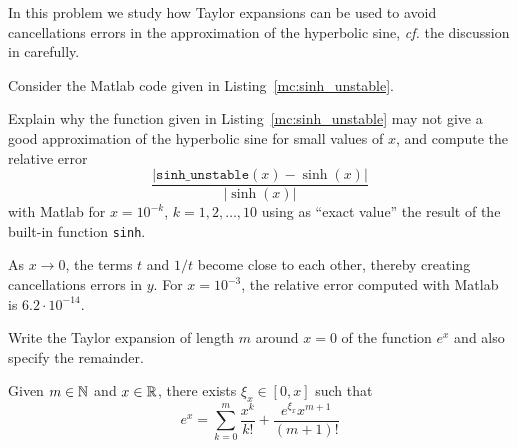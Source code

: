 
\renewcommand{\chpt}{ch_matvec}

\begin{problem} \label{prb:sinh}

In this problem we study how Taylor expansions can be used to avoid cancellations
errors in the approximation of the hyperbolic sine, \emph{cf.} the discussion in 
 carefully.

Consider the Matlab code given in Listing~\ref{mc:sinh_unstable}.


\begin{subproblem}[1]
  Explain why the function given in Listing~\ref{mc:sinh_unstable} may not give a good approximation of the hyperbolic sine for small values of $x$, and compute the relative error
  \[
\frac{|\mathtt{sinh\_unstable}(x)-\sinh(x)|}{|\sinh(x)|}
\]
with Matlab for $x=10^{-k}$, $k=1,2,\ldots,10$ using as ``exact value'' the result
of the \matlab{} built-in function \texttt{sinh}.
  \begin{solution}
As $x\to 0$, the terms $t$ and $1/t$ become close to each other, thereby creating cancellations errors in $y$. For $x=10^{-3}$, the relative error computed with Matlab is $6.2\cdot10^{-14}$.
    \end{solution}

\begin{subproblem}[1]
   Write the Taylor expansion of length $m$ around $x=0$ of the function $e^x$ 
   and also specify the remainder. 
  \begin{solution}
Given $m\in\mathbb{N}$ and $x\in \mathbb{R}$, there exists $\xi_x\in [0,x]$ such that
\begin{equation}
\label{eq:sinhx-taylor}
e^x=\sum_{k=0}^m \frac{x^k}{k!} + \frac{e^{\xi_x} x^{m+1}}{(m+1)!}
\end{equation}
    \end{solution}
\end{subproblem}



\end{subproblem}


\end{problem}
